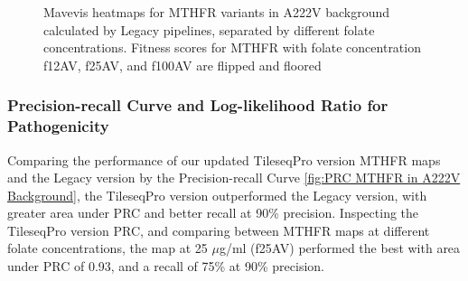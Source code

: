 \documentclass{article}
\begin{document}
\begin{figure}[H]%
    \centering
    \qquad
    \qquad
    \qquad
    \caption{Mavevis heatmaps for MTHFR variants in A222V background calculated by Legacy pipelines, separated by different folate concentrations. Fitness scores for MTHFR with folate concentration f12AV, f25AV, and f100AV are flipped and floored}%
    \label{fig:old MTHFR map}%
\end{figure}




\subsubsection{Precision-recall Curve and Log-likelihood Ratio for Pathogenicity}
Comparing the performance of our updated TileseqPro version MTHFR maps and the Legacy version by the Precision-recall Curve \ref{fig:PRC MTHFR in A222V Background}, the TileseqPro version outperformed the Legacy version, with greater area under PRC and better recall at 90\% precision. Inspecting the TileseqPro version PRC, and comparing between MTHFR maps at different folate concentrations, the map at 25 $\mu$g/ml (f25AV) performed the best with area under PRC of 0.93, and a recall of 75\% at 90\% precision.
\end{document}
